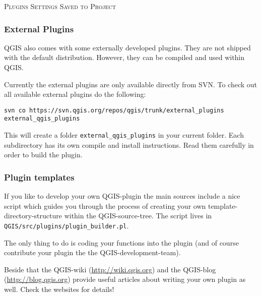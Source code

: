\begin{Tip}\caption{\textsc{Plugins Settings Saved to Project}}
\end{Tip}

%
%
\subsubsection{External Plugins}\label{sec:external_plugins}

QGIS also comes with some externally developed plugins. They are not shipped with the
default distribution. However, they can be compiled and used within QGIS.

Currently the external plugins are only available directly from SVN. 
To check out all available external plugins do the following:
\begin{verbatim}
svn co https://svn.qgis.org/repos/qgis/trunk/external_plugins external_qgis_plugins
\end{verbatim}

This will create a folder \texttt{external\_qgis\_plugins} in your current folder.
Each subdirectory has its own compile and install instructions. Read them carefully
in order to build the plugin.

%
%
\subsubsection{Plugin templates}\label{sec:plugin_template}

If you like to develop your own QGIS-plugin the main sources include a nice script
which guides you through the process of creating your own template-directory-structure
within the QGIS-source-tree.
The script lives in \texttt{QGIS/src/plugins/plugin\_builder.pl}.

The only thing to do is coding your functions into the plugin (and of course contribute
your plugin the the QGIS-development-team).

Beside that the QGIS-wiki (\url{http://wiki.qgis.org}) and the QGIS-blog (\url{http://blog.qgis.org})
provide useful articles about writing your own plugin as well.
Check the websites for details!
